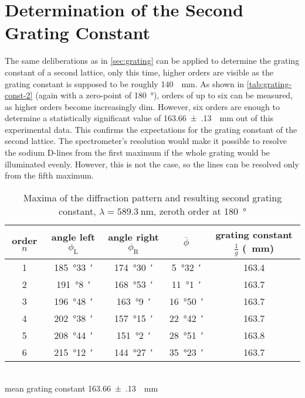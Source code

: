 \section{Determination of the Second Grating Constant}
The same deliberations as in \autoref{sec:grating} can be applied to determine the grating constant of a second lattice, only this time, higher orders are visible as the grating constant is supposed to be roughly \SI{140}{\per\mm}.
As shown in \autoref{tab:grating-const-2} (again with a zero-point of \SI{180}{\degree}), orders of up to six can be measured, as higher orders become increasingly dim.
However, six orders are enough to determine a statistically significant value of \SI{163.66(13)}{\per\mm} out of this experimental data.
This confirms the expectations for the grating constant of the second lattice.
The spectrometer's resolution would make it possible to resolve the sodium D-lines from the first maximum if the whole grating would be illuminated evenly.
However, this is not the case, so the lines can be resolved only from the fifth maximum.
\begin{table}[b!]
	\centering
	\caption[Maxima of the diffraction pattern and resulting second grating constant]{Maxima of the diffraction pattern and resulting second grating constant, $\lambda=\SI{589.3}{\nm}$, zeroth order at \SI{180}{\degree}}
	\label{tab:grating-const-2}
	\begin{tabular}{S|SSS|S}
		\toprule
		{order $n$}	&	{angle left $\phi_\text{L}$}	&	{angle right $\phi_\text{R}$}	&	{$\overline{\phi}$}	&	{grating constant $\frac{1}{g}$ (\si{\per\mm})}\\
			&	\SI{185}{\degree}\SI{33}{\arcminute}	&	\SI{174}{\degree}\SI{30}{\arcminute}	&	\SI{5}{\degree}\SI{32}{\arcminute}	&	163.4	\\
		2	&	\SI{191}{\degree}\SI{8}{\arcminute}	&	\SI{168}{\degree}\SI{53}{\arcminute}	&	\SI{11}{\degree}\SI{1}{\arcminute}	&	163.7	\\
		3	&	\SI{196}{\degree}\SI{48}{\arcminute}	&	\SI{163}{\degree}\SI{9}{\arcminute}	&	\SI{16}{\degree}\SI{50}{\arcminute}	&	163.7	\\
		4	& \SI{202}{\degree}\SI{38}{\arcminute}	&	\SI{157}{\degree}\SI{15}{\arcminute}	&	\SI{22}{\degree}\SI{42}{\arcminute}	&	163.7	\\
		5	&	\SI{208}{\degree}\SI{44}{\arcminute}	&	\SI{151}{\degree}\SI{2}{\arcminute}	&	\SI{28}{\degree}\SI{51}{\arcminute}	&	163.8	\\
		6	&	\SI{215}{\degree}\SI{12}{\arcminute}	&	\SI{144}{\degree}\SI{27}{\arcminute}	&	\SI{35}{\degree}\SI{23}{\arcminute}	&	163.7	\\
		\bottomrule
	\end{tabular}\\
	mean grating constant	\SI{163.66(13)}{\per\mm}\\
\end{table}

